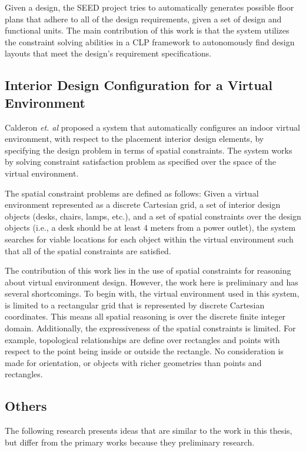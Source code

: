 \documentclass[12pt]{ucthesis}
\begin{document}
Given a design, the SEED project tries to automatically generates possible floor plans that adhere to all of the design requirements, given a set of design and functional units. The main contribution of this work is that the system utilizes the constraint solving abilities in a CLP framework to autonomously find design layouts that meet the design's requirement specifications.


\subsection{Interior Design Configuration for a Virtual Environment}
Calderon \emph{et. al} \cite{} proposed a system that automatically configures an indoor virtual environment, with respect to the placement interior design elements, by specifying the design problem in terms of spatial constraints. The system works by solving constraint satisfaction problem as specified over the space of the virtual environment.

The spatial constraint problems are defined as follows: Given a virtual environment represented as a discrete Cartesian grid, a set of interior design objects (desks, chairs, lamps, etc.), and a set of spatial constraints over the design objects (i.e., a desk should be at least 4 meters from a power outlet), the system searches for viable locations for each object within the virtual environment such that all of the spatial constraints are satisfied. 

The contribution of this work lies in the use of spatial constraints for reasoning about virtual environment design. However, the work here is preliminary and has several shortcomings. To begin with, the virtual environment used in this system, is limited to a rectangular grid that is represented by discrete Cartesian coordinates. This means all spatial reasoning is over the discrete finite integer domain. Additionally, the expressiveness of the spatial constraints is limited. For example, topological relationships are define over rectangles and points with respect to the point being inside or outside the rectangle. No consideration is made for orientation, or objects with richer geometries than points and rectangles.

\subsection{Others}
The following research presents ideas that are similar to the work in this thesis, but differ from the primary works because they preliminary research.
\end{document}
